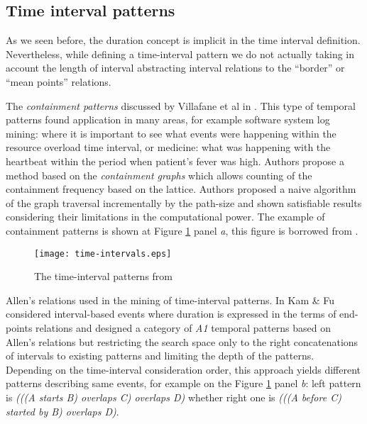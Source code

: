 \subsection{Time interval patterns}
As we seen before, the duration concept is implicit in the time interval definition. Nevertheless, while defining a time-interval pattern we do not actually taking in account the length of interval abstracting interval relations to the ``border'' or ``mean points'' relations.

The \textit{containment patterns} discussed by Villafane et al in \cite{citeulike:2804633}. This type of temporal patterns found application in many areas, for example software system log mining: where it is important to see what events were happening within the resource overload time interval, or medicine: what was happening with the heartbeat within the period when patient's fever was high. Authors propose a method based on the \textit{containment graphs} which allows counting of the containment frequency based on the lattice. Authors proposed a naive algorithm of the graph traversal incrementally by the path-size and shown satisfiable results considering their limitations in the computational power. The example of containment patterns is shown at Figure \ref{fig:timeintervals} panel \textit{a}, this figure is borrowed from \cite{citeulike:1748833}.

\begin{figure}[tbp]
   \centering
   \texttt{[image: time-intervals.eps]}
   \caption{The time-interval patterns from \cite{citeulike:1748833}}
   \label{fig:timeintervals}
\end{figure}

Allen's relations used in the mining of time-interval patterns. In \cite{citeulike:5159362} Kam \& Fu considered interval-based events where duration is expressed in the terms of end-points relations and designed a category of \textit{A1} temporal patterns based on Allen's relations but restricting the search space only to the right concatenations of intervals to existing patterns and limiting the depth of the patterns. Depending on the time-interval consideration order, this approach yields different patterns describing same events, for example on the Figure \ref{fig:timeintervals} panel \textit{b}: left pattern is \textit{(((A starts B) overlaps C) overlaps D)} whether right one is \textit{(((A before C) started by B) overlaps D)}.

